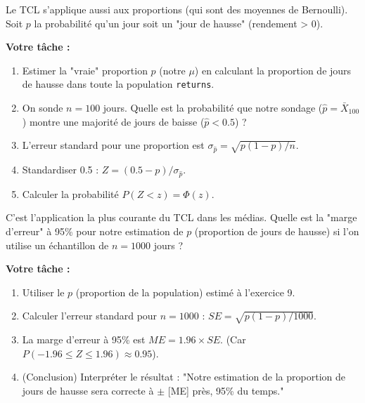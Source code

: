 \begin{exercicebox}
Le TCL s'applique aussi aux proportions (qui sont des moyennes de Bernoulli). Soit $p$ la probabilité qu'un jour soit un "jour de hausse" (rendement > 0).

\textbf{Votre tâche :}
\begin{enumerate}
    \item Estimer la "vraie" proportion $p$ (notre $\mu$) en calculant la proportion de jours de hausse dans toute la population \texttt{returns}.
    \item On sonde $n=100$ jours. Quelle est la probabilité que notre sondage ($\hat{p} = \bar{X}_{100}$) montre une majorité de jours de baisse ($\hat{p} < 0.5$) ?
    \item L'erreur standard pour une proportion est $\sigma_{\hat{p}} = \sqrt{p(1-p) / n}$.
    \item Standardiser 0.5 : $Z = (0.5 - p) / \sigma_{\hat{p}}$.
    \item Calculer la probabilité $P(Z < z) = \Phi(z)$.
\end{enumerate}
\end{exercicebox}

\begin{exercicebox}
C'est l'application la plus courante du TCL dans les médias.
Quelle est la "marge d'erreur" à 95\% pour notre estimation de $p$ (proportion de jours de hausse) si l'on utilise un échantillon de $n=1000$ jours ?

\textbf{Votre tâche :}
\begin{enumerate}
    \item Utiliser le $p$ (proportion de la population) estimé à l'exercice 9.
    \item Calculer l'erreur standard pour $n=1000$ : $SE = \sqrt{p(1-p) / 1000}$.
    \item La marge d'erreur à 95\% est $ME = 1.96 \times SE$. (Car $P(-1.96 \le Z \le 1.96) \approx 0.95$).
    \item (Conclusion) Interpréter le résultat : "Notre estimation de la proportion de jours de hausse sera correcte à $\pm$ [ME] près, 95\% du temps."
\end{enumerate}
\end{exercicebox}